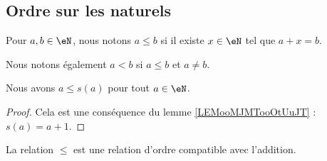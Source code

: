 \subsection{Ordre sur les naturels}

\begin{definition}     \label{DEFooAXZSooTEMjlV}
	Pour \( a,b\in \eN\), nous notons \( a\leq b\) si il existe \( x\in \eN\) tel que \( a+x=b\).

	Nous notons également \( a<b \) si \( a\leq b\) et \( a\neq b\).
\end{definition}

\begin{lemma}       \label{LEMooWMYPooLTMyWb}
	Nous avons \( a\leq s(a)\) pour tout \( a\in \eN\).
\end{lemma}

\begin{proof}
	Cela est une conséquence du lemme \ref{LEMooMJMTooOtUuJT} : \( s(a)=a+1\).
\end{proof}

\begin{proposition}     \label{PROPooVXBBooZcghrA}
	La relation \( \leq\) est une relation d'ordre compatible avec l'addition.
\end{proposition}

